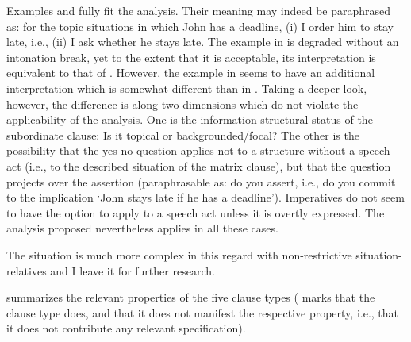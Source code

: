 \documentclass[output=paper]{langscibook}
\begin{document}
\noindent Examples  and  fully fit the analysis. Their meaning may indeed be paraphrased as: for the topic situations in which John has a deadline, (i) I order him to stay late, i.e., (ii) I ask whether he stays late. The example in  is degraded without an intonation break, yet to the extent that it is acceptable, its interpretation is equivalent to that of . However, the example in  seems to have an additional interpretation which is somewhat different than in . Taking a deeper look, however, the difference is along two dimensions which do not violate the applicability of the analysis. One is the information-structural status of the subordinate clause: Is it topical or backgrounded/focal? The other is the possibility that the yes-no question applies not to a structure without a speech act (i.e., to the described situation of the matrix clause), but that the question projects over the assertion (paraphrasable as: do you assert, i.e., do you commit to the implication `John stays late if he has a deadline'). Imperatives do not seem to have the option to apply to a speech act unless it is overtly expressed. The analysis proposed nevertheless applies in all these cases.

The situation is much more complex in this regard with non-restrictive situ\-a\-tion-relatives and I leave it for further research.

 summarizes the relevant properties of the five clause types ( marks that the clause type does, and  that it does not manifest the respective property, i.e., that it does not contribute any relevant specification).

\begin{table}
\caption{The relevant properties of the five clause types}
\label{tab:Properties}
\end{table}
\end{document}

